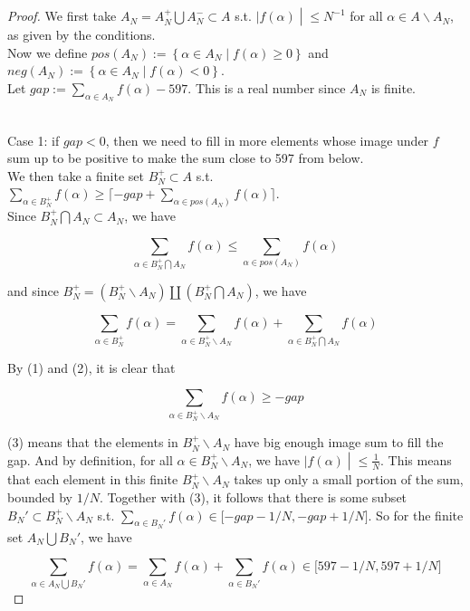 \begin{proof}

We first take \(A_{N} = A_{N}^{+}\bigcup A_{N}^{-} \subset A\) s.t. \(\left. |f(\alpha) \middle| \leq N^{- 1} \right.\) for all \(\alpha \in A\backslash A_{N}\), as given by the conditions.\\
Now we define \(pos(A_{N}) := \left\{ {\alpha \in A_{N} \mid f(\alpha) \geq 0} \right\}\) and \(neg(A_{N}) := \left\{ {\alpha \in A_{N} \mid f(\alpha) < 0} \right\}\).\\
Let \(gap := \sum_{\alpha \in A_{N}}f(\alpha) - 597\). This is a real number since \(A_{N}\) is finite.\\
\strut \\
Case 1: if \(gap < 0\), then we need to fill in more elements whose image under \(f\) sum up to be positive to make the sum close to 597 from below.\\
We then take a finite set \(B_{N}^{+} \subset A\) s.t. \(\sum_{\alpha \in B_{N}^{+}}f(\alpha) \geq \lceil - gap + \sum_{\alpha \in pos(A_{N})}f(\alpha)\rceil\).\\
Since \(B_{N}^{+}\bigcap A_{N} \subset A_{N}\), we have

\[\sum\limits_{\alpha \in B_{N}^{+}\bigcap A_{N}}f(\alpha) \leq \sum\limits_{\alpha \in pos(A_{N})}f(\alpha)\]

and since \(B_{N}^{+} = (B_{N}^{+}\backslash A_{N})\coprod(B_{N}^{+}\bigcap A_{N})\), we have

\[\sum\limits_{\alpha \in B_{N}^{+}}f(\alpha) = \sum\limits_{\alpha \in B_{N}^{+}\backslash A_{N}}f(\alpha) + \sum\limits_{\alpha \in B_{N}^{+}\bigcap A_{N}}f(\alpha)\]

By (1) and (2), it is clear that

\[\sum\limits_{\alpha \in B_{N}^{+}\backslash A_{N}}f(\alpha) \geq - gap\]

(3) means that the elements in \(B_{N}^{+}\backslash A_{N}\) have big enough image sum to fill the gap. And by definition, for all \(\alpha \in B_{N}^{+}\backslash A_{N}\), we have \(\left. |f(\alpha) \middle| \leq \frac{1}{N} \right.\). This means that each element in this finite \(B_{N}^{+}\backslash A_{N}\) takes up only a small portion of the sum, bounded by \(1/N\). Together with (3), it follows that there is some subset \(B_{N}' \subset B_{N}^{+}\backslash A_{N}\) s.t. \(\sum_{\alpha \in B_{N}'}f(\alpha) \in \lbrack - gap - 1/N, - gap + 1/N\rbrack\). So for the finite set \(A_{N}\bigcup B_{N}'\), we have

\[\sum\limits_{\alpha \in A_{N}\bigcup B_{N}'}f(\alpha) = \sum\limits_{\alpha \in A_{N}}f(\alpha) + \sum\limits_{\alpha \in B_{N}'}f(\alpha) \in \lbrack 597 - 1/N,597 + 1/N\rbrack\]


\end{proof}
